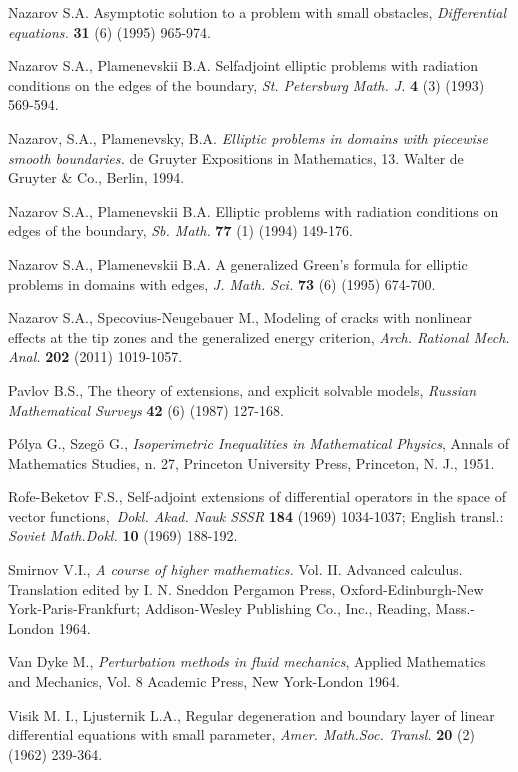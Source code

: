 \documentclass[11pt]{article}%
\numberwithin{equation}{section}
\begin{document}
\begin{thebibliography}{99}
Nazarov S.A. Asymptotic solution to a problem with small
obstacles, \textit{Differential equations.} \textbf{31} (6) (1995) 965-974.

Nazarov S.A., Plamenevskii B.A. Selfadjoint elliptic problems
with radiation conditions on the edges of the boundary, \textit{St. Petersburg
Math. J.} \textbf{4} (3) (1993) 569-594.

Nazarov, S.A., Plamenevsky, B.A. \textit{Elliptic problems in
domains with piecewise smooth boundaries.} de Gruyter Expositions in
Mathematics, 13. Walter de Gruyter \& Co., Berlin, 1994.

Nazarov S.A., Plamenevskii B.A. Elliptic problems with
radiation conditions on edges of the boundary, \textit{Sb. Math. }\textbf{77}
(1) (1994) 149-176.

Nazarov S.A., Plamenevskii B.A. A generalized Green's formula
for elliptic problems in domains with edges, \textit{J. Math. Sci.
}\textbf{73} (6) (1995) 674-700.

Nazarov S.A., Specovius-Neugebauer M., Modeling of cracks with
nonlinear effects at the tip zones and the generalized energy criterion,
\textit{Arch. Rational Mech. Anal.} \textbf{202} (2011) 1019-1057.

Pavlov B.S., The theory of extensions, and explicit solvable
models, \textit{Russian Mathematical Surveys} \textbf{42} (6) (1987) 127-168.

P\'{o}lya G., Szeg\"{o} G., \textit{Isoperimetric Inequalities
in Mathematical Physics}, Annals of Mathematics Studies, n. 27, Princeton
University Press, Princeton, N. J., 1951.

Rofe-Beketov F.S., Self-adjoint extensions of differential
operators in the space of vector functions,\ \textit{Dokl. Akad. Nauk SSSR}
\textbf{184} (1969) 1034-1037; English transl.: \textit{Soviet Math.Dokl.}
\textbf{10} (1969) 188-192.

Smirnov V.I., \textit{A course of higher mathematics. }Vol. II.
Advanced calculus. Translation edited by I. N. Sneddon Pergamon Press,
Oxford-Edinburgh-New York-Paris-Frankfurt; Addison-Wesley Publishing Co.,
Inc., Reading, Mass.-London 1964.

Van Dyke M., \textit{Perturbation methods in fluid
mechanics}, Applied Mathematics and Mechanics, Vol. 8 Academic Press, New
York-London 1964.

Visik M. I., Ljusternik L.A., Regular degeneration and boundary
layer of linear differential equations with small parameter, \textit{Amer.
Math.Soc. Transl.} \textbf{20} (2) (1962) 239-364.
\end{thebibliography}
\end{document}
